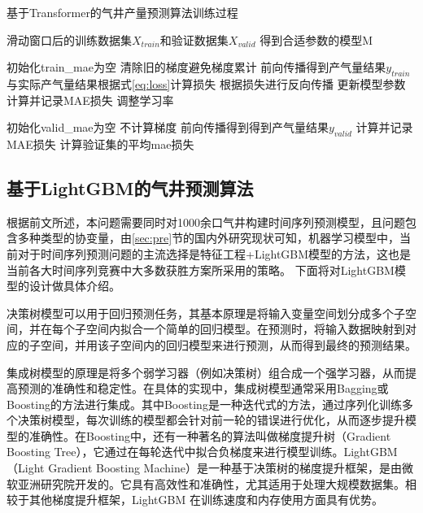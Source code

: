 \begin{algorithm}[H]
    \baselineskip=20pt
    \caption{基于Transformer的气井产量预测算法训练过程}
    \label{al:T-GRU}
    \begin{algorithmic}[1]
    \Require 滑动窗口后的训练数据集$X_{train}$和验证数据集$X_{valid}$
    \Ensure 得到合适参数的模型M

        \State 初始化train\_mae为空
            \State 清除旧的梯度避免梯度累计
            \State 前向传播得到产气量结果$y_{train}$
            \State 与实际产气量结果根据式\eqref{eq:loss}计算损失
            \State 根据损失进行反向传播
            \State 更新模型参数
        \EndFor    
        \State 计算并记录MAE损失
        \State 调整学习率

        \State 初始化valid\_mae为空
            \State 不计算梯度
            \State 前向传播得到得到产气量结果$y_{valid}$
            \State 计算并记录MAE损失
        \EndFor
        \State 计算验证集的平均mae损失
    \EndFor
    \end{algorithmic}
  \end{algorithm}
\subsection{基于LightGBM的气井预测算法}
根据前文所述，本问题需要同时对1000余口气井构建时间序列预测模型，且问题包含多种类型的协变量，由\ref{sec:pre}节的国内外研究现状可知，机器学习模型中，当前对于时间序列预测问题的主流选择是特征工程+LightGBM模型的方法，这也是当前各大时间序列竞赛中大多数获胜方案所采用的策略。
下面将对LightGBM模型的设计做具体介绍。

决策树模型可以用于回归预测任务，其基本原理是将输入变量空间划分成多个子空间，并在每个子空间内拟合一个简单的回归模型。在预测时，将输入数据映射到对应的子空间，并用该子空间内的回归模型来进行预测，从而得到最终的预测结果。

集成树模型的原理是将多个弱学习器（例如决策树）组合成一个强学习器，从而提高预测的准确性和稳定性。在具体的实现中，集成树模型通常采用Bagging或Boosting的方法进行集成。其中Boosting是一种迭代式的方法，通过序列化训练多个决策树模型，每次训练的模型都会针对前一轮的错误进行优化，从而逐步提升模型的准确性。在Boosting中，还有一种著名的算法叫做梯度提升树（Gradient Boosting Tree），它通过在每轮迭代中拟合负梯度来进行模型训练。LightGBM（Light Gradient Boosting Machine）是一种基于决策树的梯度提升框架，是由微软亚洲研究院开发的。它具有高效性和准确性，尤其适用于处理大规模数据集。相较于其他梯度提升框架，LightGBM 在训练速度和内存使用方面具有优势。

